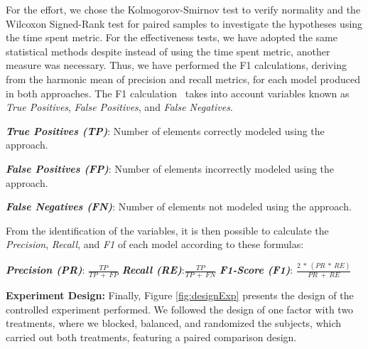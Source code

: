 For the effort, we chose the Kolmogorov-Smirnov test to verify normality and the Wilcoxon Signed-Rank test for paired samples to investigate the hypotheses using the time spent metric.
For the effectiveness tests, we have adopted the same statistical methods despite instead of using the time spent metric, another measure was necessary.
Thus, we have performed the F1 calculations, deriving from the harmonic mean of precision and recall metrics, for each model produced in both approaches.
The F1 calculation~\cite{Derczynski:2016} takes into account variables known as \textit{True Positives}, \textit{False Positives}, and \textit{False Negatives}.
\begin{description}
    \item \textbf{\textit{True Positives (TP)}}: Number of elements correctly modeled using the approach.
    \item \textbf{\textit{False Positives (FP)}}: Number of elements incorrectly modeled using the approach. 
    \item \textbf{\textit{False Negatives (FN)}}: Number of elements not modeled using the approach.
\end{description}
From the identification of the variables, it is then possible to calculate the \textit{Precision}, \textit{Recall}, and \textit{F1} of each model according to these formulas:
\begin{description}
    \item \textbf{\textit{Precision (PR)}}: $\frac{TP}{TP~+~FP}$ 
    \hfill 
    \textbf{\textit{Recall (RE)}}:$\frac{TP}{TP~+~FN}$
    \hfill
    \textbf{\textit{F1-Score (F1)}}: $\frac{2~*~(PR~*~ RE)}{PR~+~RE}$
\end{description}

\textbf{Experiment Design:} Finally, Figure \ref{fig:designExp} presents the design of the controlled experiment performed. 
We followed the design of one factor with two treatments, where we blocked, balanced, and randomized the subjects, which carried out both treatments, featuring a paired comparison design.

